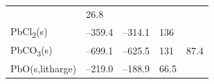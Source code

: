\documentclass[
  9pt,
]{extbook}
\theoremstyle{definition}
\theoremstyle{definition}
\theoremstyle{definition}
\theoremstyle{remark}
\begin{document}
\begin{longtable}[]{@{}lllll@{}}
\begin{minipage}[t]{0.18\columnwidth}
\end{minipage} & \begin{minipage}[t]{0.18\columnwidth}\raggedright
26.8\strut
\end{minipage}\tabularnewline
\begin{minipage}[t]{0.10\columnwidth}\raggedright
PbCl\textsubscript{2}(s)\strut
\end{minipage} & \begin{minipage}[t]{0.19\columnwidth}\raggedright
--359.4\strut
\end{minipage} & \begin{minipage}[t]{0.20\columnwidth}\raggedright
--314.1\strut
\end{minipage} & \begin{minipage}[t]{0.18\columnwidth}\raggedright
136\strut
\end{minipage} & \begin{minipage}[t]{0.18\columnwidth}\raggedright
\strut
\end{minipage}\tabularnewline
\begin{minipage}[t]{0.10\columnwidth}\raggedright
PbCO\textsubscript{3}(s)\strut
\end{minipage} & \begin{minipage}[t]{0.19\columnwidth}\raggedright
--699.1\strut
\end{minipage} & \begin{minipage}[t]{0.20\columnwidth}\raggedright
--625.5\strut
\end{minipage} & \begin{minipage}[t]{0.18\columnwidth}\raggedright
131\strut
\end{minipage} & \begin{minipage}[t]{0.18\columnwidth}\raggedright
87.4\strut
\end{minipage}\tabularnewline
\begin{minipage}[t]{0.10\columnwidth}\raggedright
PbO(s,litharge)\strut
\end{minipage} & \begin{minipage}[t]{0.19\columnwidth}\raggedright
--219.0\strut
\end{minipage} & \begin{minipage}[t]{0.20\columnwidth}\raggedright
--188.9\strut
\end{minipage} & \begin{minipage}[t]{0.18\columnwidth}\raggedright
66.5\strut
\end{minipage} & \begin{minipage}[t]{0.18\columnwidth}\raggedright

\end{minipage}
\end{longtable}
\end{document}
